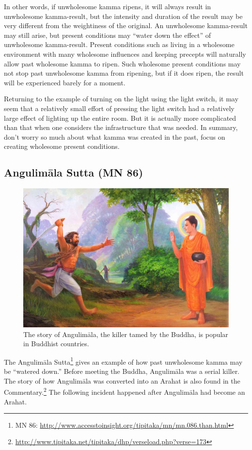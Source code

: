 In other words, if unwholesome kamma ripens, it will always result in unwholesome kamma-result, but the intensity and duration of the result may be very different from the weightiness of the original. An unwholesome kamma-result may still arise, but present conditions may “water down the effect” of unwholesome kamma-result. Present conditions such as living in a wholesome environment with many wholesome influences and keeping precepts will naturally allow past wholesome kamma to ripen. Such wholesome present conditions may not stop past unwholesome kamma from ripening, but if it does ripen, the result will be experienced barely for a moment.

Returning to the example of turning on the light using the light switch, it may seem that a relatively small effort of pressing the light switch had a relatively large effect of lighting up the entire room. But it is actually more complicated than that when one considers the infrastructure that was needed. In summary, don’t worry so much about what kamma was created in the past, focus on creating wholesome present conditions.

\pagebreak

\subsection*{Angulimāla Sutta (MN 86)}

\begin{figure}[h]
\centering
\includegraphics[width=0.7\linewidth]{./Diagrams/angulimala}
\caption{The story of Angulimāla, the killer tamed by the Buddha, is popular in Buddhist countries.}
\label{fig:angulimala}
\end{figure}

The Angulimāla Sutta\footnote{MN 86: \url{http://www.accesstoinsight.org/tipitaka/mn/mn.086.than.html}} gives an example of how past unwholesome kamma may be “watered down.” Before meeting the Buddha, Angulimāla was a serial killer. The story of how Angulimāla was converted into an Arahat is also found in the Commentary.\footnote{\url{http://www.tipitaka.net/tipitaka/dhp/verseload.php?verse=173}} The following incident happened after Angulimāla had become an Arahat.

